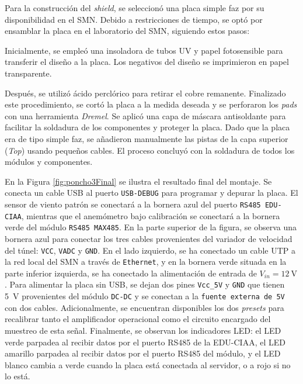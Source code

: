 Para la construcción del \textit{shield}, se seleccionó una placa simple faz por su disponibilidad en el SMN. Debido a restricciones de tiempo, se optó por ensamblar la placa en el laboratorio del SMN, siguiendo estos pasos:

Inicialmente, se empleó una insoladora de tubos UV y papel fotosensible para transferir el diseño a la placa. Los negativos del diseño se imprimieron en papel transparente.

Después, se utilizó ácido perclórico para retirar el cobre remanente. Finalizado este procedimiento, se cortó la placa a la medida deseada y se perforaron los \textit{pads} con una herramienta \textit{Dremel}. Se aplicó una capa de máscara antisoldante para facilitar la soldadura de los componentes y proteger la placa. Dado que la placa era de tipo simple faz, se añadieron manualmente las pistas de la capa superior (\textit{Top}) usando pequeños cables. El proceso concluyó con la soldadura de todos los módulos y componentes. 

En la Figura \ref{fig:poncho3Final} se ilustra el resultado final del montaje. Se conecta un cable USB al puerto \texttt{USB-DEBUG} para programar y depurar la placa. El sensor de viento patrón se conectará a la bornera azul del puerto \texttt{RS485 EDU-CIAA}, mientras que el anemómetro bajo calibración se conectará a la bornera verde del módulo \texttt{RS485 MAX485}. En la parte superior de la figura, se observa una bornera azul para conectar los tres cables provenientes del variador de velocidad del túnel: \texttt{VCC}, \texttt{VADC} y \texttt{GND}. En el lado izquierdo, se ha conectado un cable UTP a la red local del SMN a través de \texttt{Ethernet}, y en la bornera verde situada en la parte inferior izquierda, se ha conectado la alimentación de entrada de $V_{in} = \SI{12}{\volt}$. Para alimentar la placa sin USB, se dejan dos pines \texttt{Vcc\_5V} y \texttt{GND} que tienen \SI{5}{\volt} provenientes del módulo \texttt{DC-DC} y se conectan a la \texttt{fuente externa de 5V} con dos cables. Adicionalmente, se encuentran disponibles los dos \textit{presets} para recalibrar tanto el amplificador operacional como el circuito encargado del muestreo de esta señal. Finalmente, se observan los indicadores LED: el LED verde parpadea al recibir datos por el puerto RS485 de la EDU-CIAA, el LED amarillo parpadea al recibir datos por el puerto RS485 del módulo, y el LED blanco cambia a verde cuando la placa está conectada al servidor, o a rojo si no lo está.



